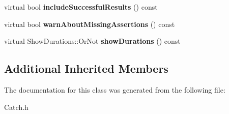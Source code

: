 \begin{DoxyCompactItemize}
\item 
\hypertarget{class_catch_1_1_config_aea5f577057289ee2113cbe5adf296e69}{virtual bool {\bfseries include\-Successful\-Results} () const }\label{class_catch_1_1_config_aea5f577057289ee2113cbe5adf296e69}

\item 
\hypertarget{class_catch_1_1_config_ab8fdb451c6e214a24e8ff538ffaaa7e5}{virtual bool {\bfseries warn\-About\-Missing\-Assertions} () const }\label{class_catch_1_1_config_ab8fdb451c6e214a24e8ff538ffaaa7e5}

\item 
\hypertarget{class_catch_1_1_config_a192ff42482ade89d8225fcc0851909fd}{virtual Show\-Durations\-::\-Or\-Not {\bfseries show\-Durations} () const }\label{class_catch_1_1_config_a192ff42482ade89d8225fcc0851909fd}

\end{DoxyCompactItemize}
\subsection*{Additional Inherited Members}


The documentation for this class was generated from the following file\-:\begin{DoxyCompactItemize}
\item 
Catch.\-h\end{DoxyCompactItemize}
